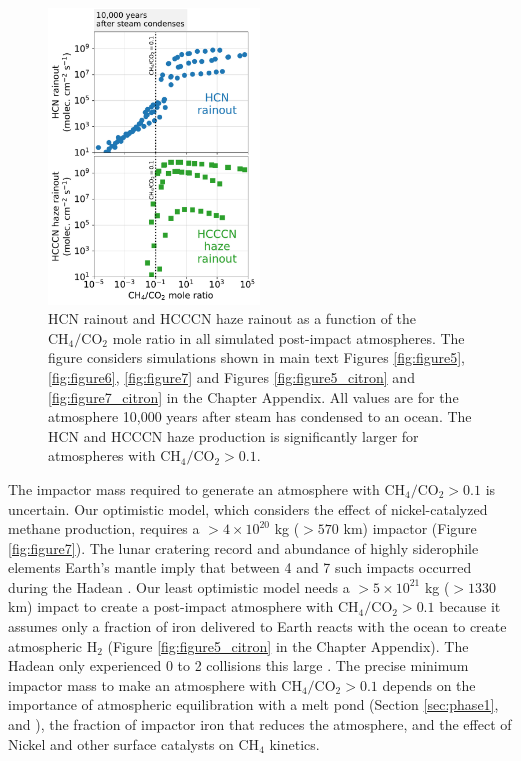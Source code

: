 \begin{figure}
  \centering
  \includegraphics[width=0.5\textwidth]{tex/5impacts/figures/Figure7_5.pdf}
  \caption{HCN rainout and HCCCN haze rainout as a function of the $\mathrm{CH_4}/\mathrm{CO_2}$ mole ratio in all simulated post-impact atmospheres. The figure considers simulations shown in main text Figures \ref{fig:figure5}, \ref{fig:figure6}, \ref{fig:figure7} and Figures \ref{fig:figure5_citron} and \ref{fig:figure7_citron} in the Chapter Appendix. All values are for the atmosphere 10,000 years after steam has condensed to an ocean. The HCN and HCCCN haze production is significantly larger for atmospheres with $\mathrm{CH_4}/\mathrm{CO_2} > 0.1$.}
  \label{fig:figure7_5}
\end{figure}

The impactor mass required to generate an atmosphere with $\mathrm{CH_4}/\mathrm{CO_2} > 0.1$ is uncertain. Our optimistic model, which considers the effect of nickel-catalyzed methane production, requires a $> 4 \times 10^{20}$ kg ($> 570$ km) impactor (Figure \ref{fig:figure7}). The lunar cratering record and abundance of highly siderophile elements Earth's mantle imply that between 4 and 7 such impacts occurred during the Hadean \citep{Marchi_2014, Zahnle_2020}. Our least optimistic model needs a $> 5 \times 10^{21}$ kg ($> 1330$ km) impact to create a post-impact atmosphere with $\mathrm{CH_4}/\mathrm{CO_2} > 0.1$ because it assumes only a fraction of iron delivered to Earth reacts with the ocean to create atmospheric H$_2$ (Figure \ref{fig:figure5_citron} in the Chapter Appendix). The Hadean only experienced 0 to 2 collisions this large \citep{Zahnle_2020}. The precise minimum impactor mass to make an atmosphere with $\mathrm{CH_4}/\mathrm{CO_2} > 0.1$ depends on the importance of atmospheric equilibration with a melt pond (Section \ref{sec:phase1}, and \citet{Itcovitz_2022}), the fraction of impactor iron that reduces the atmosphere, and the effect of Nickel and other surface catalysts on CH$_4$ kinetics.

